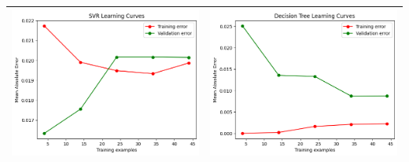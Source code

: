 \begin{table}[H]
    \centering
    \footnotesize
    \setlength\tabcolsep{0pt}
    \begin{tabularx}{\textwidth}{|X|X|}
        \hline
        \includegraphics[width=\linewidth, trim=0 0 0 0]{images/SVR_lc60_ridottoAzure.png} &
        \includegraphics[width=\linewidth, trim=0 0 0 0]{images/DecisionTree_lc60_ridottoAzure.png} \\
        \hline

\end{tabularx}
\end{table}
